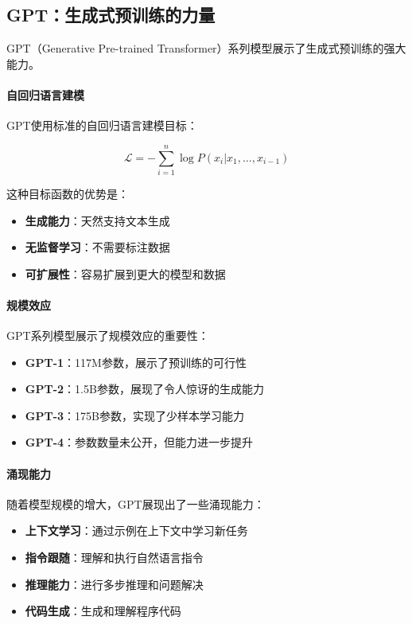\subsection{GPT：生成式预训练的力量}

GPT（Generative Pre-trained Transformer）系列模型展示了生成式预训练的强大能力。

\paragraph{自回归语言建模}
GPT使用标准的自回归语言建模目标：

$$\mathcal{L} = -\sum_{i=1}^n \log P(x_i | x_1, \ldots, x_{i-1})$$

这种目标函数的优势是：
\begin{itemize}
\item \textbf{生成能力}：天然支持文本生成
\item \textbf{无监督学习}：不需要标注数据
\item \textbf{可扩展性}：容易扩展到更大的模型和数据
\end{itemize}

\paragraph{规模效应}
GPT系列模型展示了规模效应的重要性：

\begin{itemize}
\item \textbf{GPT-1}：117M参数，展示了预训练的可行性
\item \textbf{GPT-2}：1.5B参数，展现了令人惊讶的生成能力
\item \textbf{GPT-3}：175B参数，实现了少样本学习能力
\item \textbf{GPT-4}：参数数量未公开，但能力进一步提升
\end{itemize}

\paragraph{涌现能力}
随着模型规模的增大，GPT展现出了一些涌现能力：
\begin{itemize}
\item \textbf{上下文学习}：通过示例在上下文中学习新任务
\item \textbf{指令跟随}：理解和执行自然语言指令
\item \textbf{推理能力}：进行多步推理和问题解决
\item \textbf{代码生成}：生成和理解程序代码
\end{itemize}

